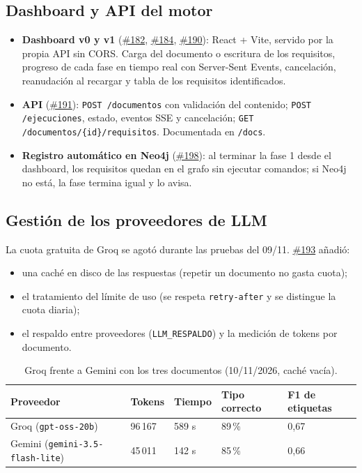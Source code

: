\documentclass[11pt,a4paper]{report}
\newcommand{\pr}[1]{\href{https://github.com/PracticasESPE/Framework_Desarrollo_Seguro/pull/#1}{\##1}}
\begin{document}
\subsection{Dashboard y API del motor}
\begin{itemize}
\item \textbf{Dashboard v0 y v1} (\pr{182}, \pr{184}, \pr{190}): React + Vite, servido por la
propia API sin CORS. Carga del documento o escritura de los requisitos, progreso de cada fase en
tiempo real con Server-Sent Events, cancelación, reanudación al recargar y tabla de los requisitos
identificados.
\item \textbf{API} (\pr{191}): \texttt{POST /documentos} con validación del contenido;
\texttt{POST /ejecuciones}, estado, eventos SSE y cancelación; \texttt{GET
/documentos/\{id\}/requisitos}. Documentada en \texttt{/docs}.
\item \textbf{Registro automático en Neo4j} (\pr{198}): al terminar la fase 1 desde el dashboard,
los requisitos quedan en el grafo sin ejecutar comandos; si Neo4j no está, la fase termina igual y
lo avisa.
\end{itemize}

\subsection{Gestión de los proveedores de LLM}
La cuota gratuita de Groq se agotó durante las pruebas del 09/11. \pr{193} añadió:
\begin{itemize}
\item una caché en disco de las respuestas (repetir un documento no gasta cuota);
\item el tratamiento del límite de uso (se respeta \texttt{retry-after} y se distingue la cuota
diaria);
\item el respaldo entre proveedores (\texttt{LLM\_RESPALDO}) y la medición de tokens por documento.
\end{itemize}

\begin{table}[H]
\centering
\caption{Groq frente a Gemini con los tres documentos (10/11/2026, caché vacía).}
\begin{tabularx}{\textwidth}{@{}LC{2.0cm}C{1.6cm}C{2.2cm}C{2.4cm}@{}}
\toprule
\textbf{Proveedor} & \textbf{Tokens} & \textbf{Tiempo} & \textbf{Tipo correcto} & \textbf{F1 de etiquetas}\\
\midrule
Groq (\texttt{gpt-oss-20b}) & 96\,167 & 589 s & 89\,\% & 0,67\\
Gemini (\texttt{gemini-3.5-flash-lite}) & 45\,011 & 142 s & 85\,\% & 0,66\\
\bottomrule
\end{tabularx}
\end{table}
\end{document}
